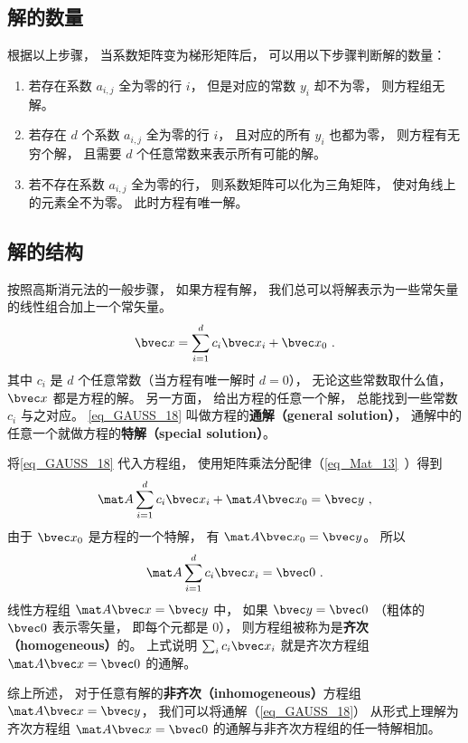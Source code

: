 \subsection{解的数量}
根据以上步骤， 当系数矩阵变为梯形矩阵后， 可以用以下步骤判断解的数量：
\begin{enumerate}
\item 若存在系数 $a_{i,j}$ 全为零的行 $i$， 但是对应的常数 $y_i$ 却不为零， 则方程组无解。
\item 若存在 $d$ 个系数 $a_{i,j}$ 全为零的行 $i$， 且对应的所有 $y_i$ 也都为零， 则方程有无穷个解， 且需要 $d$ 个任意常数来表示所有可能的解。
\item 若不存在系数 $a_{i,j}$ 全为零的行， 则系数矩阵可以化为三角矩阵， 使对角线上的元素全不为零。 此时方程有唯一解。
\end{enumerate}

\subsection{解的结构}
按照高斯消元法的一般步骤， 如果方程有解， 我们总可以将解表示为一些常矢量的线性组合加上一个常矢量。
\begin{equation}\label{eq_GAUSS_18}
\bvec x = \sum_{i=1}^{d} c_i \bvec x_i + \bvec x_0~.
\end{equation}
其中 $c_i$ 是 $d$ 个任意常数（当方程有唯一解时 $d = 0$）， 无论这些常数取什么值， $\bvec x$ 都是方程的解。 另一方面， 给出方程的任意一个解， 总能找到一些常数 $c_i$ 与之对应。 \autoref{eq_GAUSS_18} 叫做方程的\textbf{通解（general solution）}， 通解中的任意一个就做方程的\textbf{特解（special solution）}。

将\autoref{eq_GAUSS_18} 代入方程组， 使用矩阵乘法分配律（\autoref{eq_Mat_13}~）得到
\begin{equation}
\mat A \sum_{i=1}^{d} c_i \bvec x_i + \mat A \bvec x_0 = \bvec y~,
\end{equation}
由于 $\bvec x_0$ 是方程的一个特解， 有 $\mat A \bvec x_0 = \bvec y$。 所以
\begin{equation}
\mat A \sum_{i=1}^{d} c_i \bvec x_i = \bvec 0~.
\end{equation}
线性方程组 $\mat A \bvec x = \bvec y$ 中， 如果 $\bvec y = \bvec 0$ （粗体的 $\bvec 0$ 表示零矢量， 即每个元都是 $0$），%
则方程组被称为是\textbf{齐次（homogeneous）}的。 上式说明 $\sum_{i} c_i \bvec x_i$ 就是齐次方程组 $\mat A \bvec x = \bvec 0$ 的通解。

综上所述， 对于任意有解的\textbf{非齐次（inhomogeneous）}方程组 $\mat A \bvec x = \bvec y$， 我们可以将通解（\autoref{eq_GAUSS_18}） 从形式上理解为齐次方程组 $\mat A \bvec x = \bvec 0$ 的通解与非齐次方程组的任一特解相加。
